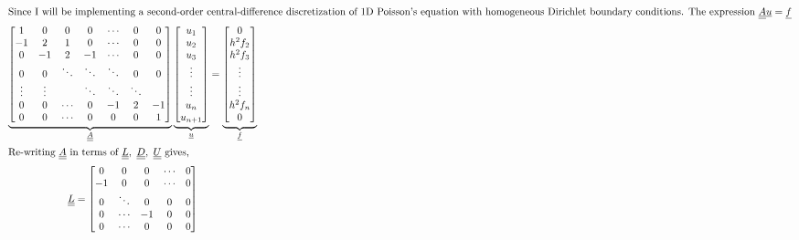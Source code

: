 \begin{enumerate}[label=\alph*., start = 1]
    \vspace{-0.25in}
    \begin{gather*}
        \shortintertext{Since I will be implementing a second-order central-difference discretization of 1D Poisson's equation with homogeneous Dirichlet boundary conditions. The expression $\underline{\underline{A}}\underline{u} = \underline{f}$}
        \underbrace{\begin{bmatrix}
            1 & 0 & 0 & 0 & \cdots & 0 & 0\\
           -1 & 2 & 1 & 0 & \cdots & 0 & 0\\
           0 & -1 & 2 & -1 & \cdots & 0 & 0\\
           0 & 0 & \ddots & \ddots & \ddots & 0 & 0\\
           \vdots & \vdots &  & \ddots & \ddots & \ddots &  \\
           0 & 0 & \cdots & 0 & -1 & 2 & -1\\
           0 & 0 & \cdots & 0 & 0 & 0 & 1
        \end{bmatrix}}_{\underline{\underline{A}}} \underbrace{\begin{bmatrix}
            u_1\\ u_2\\ u_3\\ \vdots\\ \vdots\\ u_n\\ u_{n+1} \end{bmatrix}}_{\underline{u}}
            = \underbrace{\begin{bmatrix} 0\\ h^2f_2\\ h^2f_3\\ \vdots\\ \vdots\\ h^2f_n\\ 0 \end{bmatrix}}_{\underline{f}}\\
        \shortintertext{Re-writing $\underline{\underline{A}}$ in terms of $\underline{\underline{L}},\ \underline{\underline{D}},\ \underline{\underline{U}}$ gives,}
        \underline{\underline{L}} = \begin{bmatrix}
            0 & 0 & 0 &  \cdots & 0\\
           -1 & 0 & 0 &  \cdots & 0\\
            0 & \ddots & 0  & 0 & 0\\
            0 & \cdots & -1 & 0 & 0\\
            0 & \cdots &  0 & 0 & 0

\end{bmatrix}
\end{gather*}
\end{enumerate}
